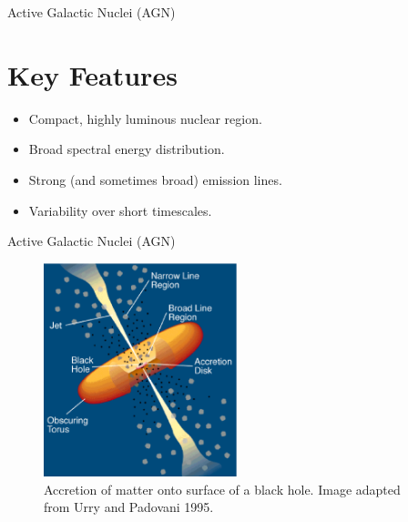 \documentclass{beamer}
\begin{document}
\begin{frame}{Active Galactic Nuclei (AGN)}
  \section{Key Features}
  \begin{itemize}
    \item Compact, highly luminous nuclear region.
    \item Broad spectral energy distribution.
    \item Strong (and sometimes broad) emission lines.
    \item Variability over short timescales.
  \end{itemize}
\end{frame}

\begin{frame}{Active Galactic Nuclei (AGN)}
  \begin{figure}
    \centering
    \includegraphics[width=0.5\textwidth]{agn_model}
    \caption{Accretion of matter onto surface of a black hole. Image adapted from Urry and Padovani 1995.}
  \end{figure}
\end{frame}
\end{document}
